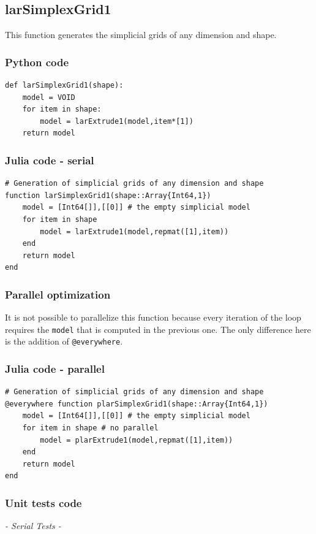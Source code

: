\documentclass[a4paper,12pt,titlepage]{article}					%
\begin{document}
\subsection{larSimplexGrid1}
This function generates the simplicial grids of any dimension and shape.

\subsubsection{Python code}
\begin{verbatim}
def larSimplexGrid1(shape):
    model = VOID
    for item in shape:
        model = larExtrude1(model,item*[1])
    return model
\end{verbatim}

\subsubsection{Julia code - serial}
\begin{Verbatim}
# Generation of simplicial grids of any dimension and shape
function larSimplexGrid1(shape::Array{Int64,1})
	model = [Int64[]],[[0]] # the empty simplicial model
	for item in shape
		model = larExtrude1(model,repmat([1],item))
	end
	return model
end
\end{Verbatim}

\subsubsection{Parallel optimization}
It is not possible to parallelize this function because every iteration of the loop requires the \texttt{model} that is computed in the previous one.
The only difference here is the addition of \texttt{@everywhere}.

\subsubsection{Julia code - parallel}
\begin{Verbatim}
# Generation of simplicial grids of any dimension and shape
@everywhere function plarSimplexGrid1(shape::Array{Int64,1})
	model = [Int64[]],[[0]] # the empty simplicial model
	for item in shape # no parallel
		model = plarExtrude1(model,repmat([1],item))
	end
	return model
end
\end{Verbatim}

\subsubsection{Unit tests code}
\emph{- Serial Tests -}
\end{document}
